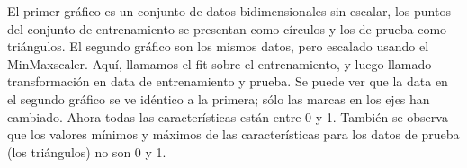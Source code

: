 El primer gráfico es un conjunto de datos bidimensionales sin escalar, los puntos del conjunto de entrenamiento se presentan como círculos y los de prueba  como triángulos. El segundo gráfico    son los mismos datos, pero escalado usando el {\ttfamily MinMaxscaler}. Aquí, llamamos el {\ttfamily fit}  sobre el entrenamiento, y luego llamado transformación en data de entrenamiento y prueba.  Se puede ver que la data en el segundo  gráfico   se ve idéntico a la primera; sólo las marcas en los ejes han cambiado. Ahora todas las características están entre 0 y 1. También se observa que los valores mínimos y máximos de las características para los datos de prueba (los triángulos) no son 0 y 1.\\

\vspace{-2cm}	
\hspace{-1cm}
